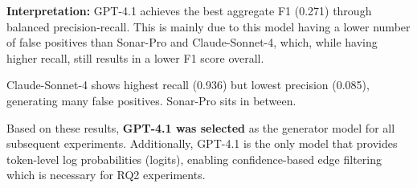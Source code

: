 \begin{table}[H]
\begin{threeparttable}
\begin{tablenotes}
\item \textbf{Interpretation:} GPT-4.1 achieves the best aggregate F1 (0.271) through balanced precision-recall. This is mainly due to this model having a lower number of false positives than Sonar-Pro and Claude-Sonnet-4, which, while having higher recall, still results in a lower F1 score overall.
\item Claude-Sonnet-4 shows highest recall (0.936) but lowest precision (0.085), generating many false positives. Sonar-Pro sits in between.
\item Based on these results, \textbf{GPT-4.1 was selected} as the generator model for all subsequent experiments. Additionally, GPT-4.1 is the only model that provides token-level log probabilities (logits), enabling confidence-based edge filtering which is necessary for RQ2 experiments.
\end{tablenotes}
\end{threeparttable}
\end{table}